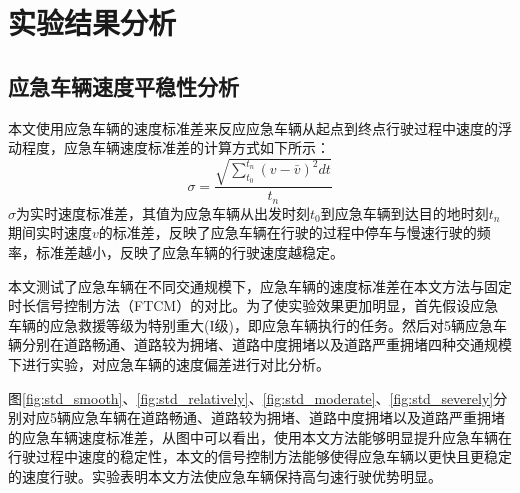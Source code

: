 



\section{实验结果分析}
\subsection{应急车辆速度平稳性分析}
本文使用应急车辆的速度标准差来反应应急车辆从起点到终点行驶过程中速度的浮动程度，应急车辆速度标准差的计算方式如下所示：
\begin{equation}
	\label{equation:sigma}
	\sigma = \dfrac{\sqrt{\sum_{t_0}^{t_n} (v-\bar{v})^2 dt}}{t_n}
\end{equation}
${\sigma}$为实时速度标准差，其值为应急车辆从出发时刻${t_0}$到应急车辆到达目的地时刻${t_n}$期间实时速度${v}$的标准差，反映了应急车辆在行驶的过程中停车与慢速行驶的频率，标准差越小，反映了应急车辆的行驶速度越稳定。

本文测试了应急车辆在不同交通规模下，应急车辆的速度标准差在本文方法与固定时长信号控制方法（FTCM）的对比。为了使实验效果更加明显，首先假设应急车辆的应急救援等级为特别重大(I级)，即应急车辆执行的任务。然后对5辆应急车辆分别在道路畅通、道路较为拥堵、道路中度拥堵以及道路严重拥堵四种交通规模下进行实验，对应急车辆的速度偏差进行对比分析。


图\ref{fig:std_smooth}、\ref{fig:std_relatively}、\ref{fig:std_moderate}、\ref{fig:std_severely}分别对应5辆应急车辆在道路畅通、道路较为拥堵、道路中度拥堵以及道路严重拥堵的应急车辆速度标准差，从图中可以看出，使用本文方法能够明显提升应急车辆在行驶过程中速度的稳定性，本文的信号控制方法能够使得应急车辆以更快且更稳定的速度行驶。实验表明本文方法使应急车辆保持高匀速行驶优势明显。

